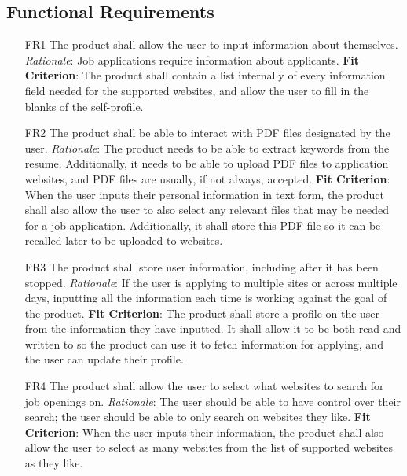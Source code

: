 \documentclass[12pt, titlepage]{article}
\begin{document}
\FloatBarrier

\subsection{Functional Requirements}

\begin{itemize}
    \item [FR1] The product shall allow the user to input information about themselves.
	{\newline \emph{Rationale}: Job applications require information about applicants.  
	\newline \textbf{Fit Criterion}: The product shall contain a list internally of every information field needed for the supported websites, and allow the user to fill in the blanks of the self-profile.}
	
    \item [FR2] The product shall be able to interact with PDF files designated by the user.
	{\newline \emph{Rationale}: The product needs to be able to extract keywords from the resume. Additionally, it needs to be able to upload PDF files to application websites, and PDF files are usually, if not always, accepted.    
	\newline \textbf{Fit Criterion}: When the user inputs their personal information in text form, the product shall also allow the user to also select any relevant files that may be needed for a job application. Additionally, it shall store this PDF file so it can be recalled later to be uploaded to websites.}
	
	\item [FR3] The product shall store user information, including after it has been stopped. 
	{\newline \emph{Rationale}: If the user is applying to multiple sites or across multiple days, inputting all the information each time is working against the goal of the product. 
	\newline \textbf{Fit Criterion}: The product shall store a profile on the user from the information they have inputted. It shall allow it to be both read and written to so the product can use it to fetch information for applying, and the user can update their profile.}
	
	\item [FR4] The product shall allow the user to select what websites to search for job openings on. 
	{\newline \emph{Rationale}: The user should be able to have control over their search; the user should be able to only search on websites they like.
	\newline \textbf{Fit Criterion}: When the user inputs their information, the product shall also allow the user to select as many websites from the list of supported websites as they like.}
	

\end{itemize}
\end{document}
